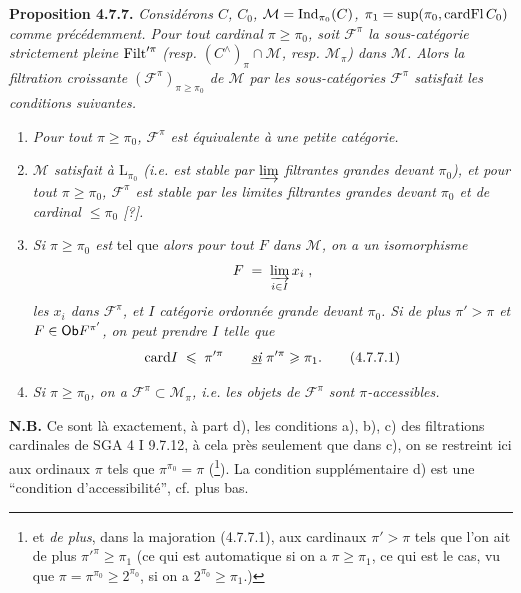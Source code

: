 \textbf{Proposition 4.7.7.} \textit{Considérons $C$, $C_0$, $\mathcal{M} = \operatorname{Ind}_{\pi_0}(C)$, $\pi_1 = \sup(\pi_0, \mathrm{card} \mathrm{Fl}\, C_0)$ comme précédemment. Pour tout cardinal $\pi \geqslant \pi_0$, soit $\mathcal{F}^{\pi}$ la sous-catégorie strictement pleine} $\mathrm{Filt}'^{\pi}$ \textit{(resp. $(C^{\wedge})_{\pi} \cap \mathcal{M}$, resp. $\mathcal{M}_{\pi}$) dans $\mathcal{M}$. Alors la filtration croissante $(\mathcal{F}^{\pi})_{\pi \geqslant \pi_0}$ de $\mathcal{M}$ par les sous-catégories $\mathcal{F}^{\pi}$ satisfait les conditions suivantes.}
\begin{enumerate}
\item[\textit{a)}] \textit{Pour tout $\pi \geqslant \pi_0$, $\mathcal{F}^{\pi}$ est équivalente à une petite catégorie.}
\item[\textit{b)}] \textit{$\mathcal{M}$ satisfait à $\mathrm{L}_{\pi_0}$ (i.e. est stable par $\varinjlim$ filtrantes grandes devant $\pi_0$), et pour tout $\pi \geqslant \pi_0$, $\mathcal{F}^{\pi}$ est stable par les limites filtrantes grandes devant $\pi_0$ et de cardinal $\leqslant \pi_0$ [?].}
\item[\textit{c)}] \textit{Si $\pi \geqslant \pi_0$ est} tel que  \textit{alors pour tout $F$ dans $\mathcal{M}$, on a un isomorphisme}
\[
F \;=\; \varinjlim_{i \in I} x_i \;,
\]
\textit{les $x_i$ dans $\mathcal{F}^{\pi}$, et $I$ catégorie ordonnée grande devant $\pi_0$. Si de plus $\pi' > \pi$ et $F \in \mathsf{Ob} F^{\pi'}$, on peut prendre $I$ telle que} %
\[
\card I \;\leqslant\; \pi'^{\pi} \qquad \underline{\textit{si}}\ \pi'^{\pi} \geqslant \pi_1. \tag*{(4.7.7.1)}
\]
\item[\textit{d)}] \textit{Si $\pi \geqslant \pi_0$, on a $\mathcal{F}^{\pi} \subset \mathcal{M}_{\pi}$, i.e. les objets de $\mathcal{F}^{\pi}$ sont $\pi$-accessibles.}
\end{enumerate}
\textbf{N.B.} Ce sont là exactement, à part d), les conditions a), b), c) des filtrations cardinales de SGA 4 I 9.7.12,  à cela près seulement que dans c), on se restreint ici aux ordinaux $\pi$ tels que $\pi^{\pi_0} = \pi$ (\footnote[72]{et \textit{de plus}, dans la majoration (4.7.7.1), aux cardinaux $\pi' > \pi$ tels que l’on ait de plus $\pi'^{\pi} \geqslant \pi_1$ (ce qui est automatique si on a $\pi \geqslant \pi_1$, ce qui est le cas, vu que $\pi = \pi^{\pi_0} \geqslant 2^{\pi_0}$, si on a $2^{\pi_0} \geqslant \pi_1$.)}). La condition supplémentaire d) est une “condition d’accessibilité”, cf. plus bas.

